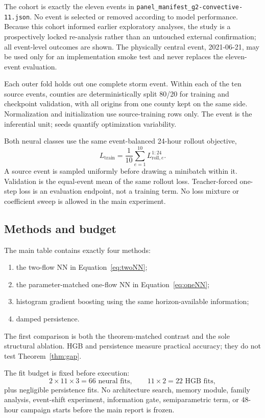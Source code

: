 \documentclass[twoside]{article}
\theoremstyle{plain}
\theoremstyle{definition}
\theoremstyle{remark}
\begin{document}
The cohort is exactly the eleven events in
\texttt{panel\_manifest\_g2-convective-11.json}. No event is selected or
removed according to model performance. Because this cohort informed earlier
exploratory analyses, the study is a prospectively locked re-analysis rather
than an untouched external confirmation; all event-level outcomes are shown.
The physically central event, 2021-06-21, may be used only for an implementation
smoke test and never replaces the eleven-event evaluation.

Each outer fold holds out one complete storm event. Within each of the ten
source events, counties are deterministically split 80/20 for training and
checkpoint validation, with all origins from one county kept on the same side.
Normalization and initialization use source-training rows only. The event is
the inferential unit; seeds quantify optimization variability.

Both neural classes use the same event-balanced 24-hour rollout objective,
\begin{equation}
L_{\mathrm{train}}=\frac1{10}\sum_{e=1}^{10}
L_{\mathrm{roll},e}^{1:24}.
\label{eq:objective}
\end{equation}
A source event is sampled uniformly before drawing a minibatch within it.
Validation is the equal-event mean of the same rollout loss. Teacher-forced
one-step loss is an evaluation endpoint, not a training term. No loss mixture
or coefficient sweep is allowed in the main experiment.

\subsection{Methods and budget}

The main table contains exactly four methods:
\begin{enumerate}
\item the two-flow NN in Equation~\eqref{eq:twoNN};
\item the parameter-matched one-flow NN in Equation~\eqref{eq:oneNN};
\item histogram gradient boosting using the same horizon-available information;
\item damped persistence.
\end{enumerate}
The first comparison is both the theorem-matched contrast and the sole
structural ablation. HGB and persistence measure practical accuracy; they do
not test Theorem~\ref{thm:gap}.

The fit budget is fixed before execution:
\[
2\times11\times3=66\text{ neural fits},\qquad
11\times2=22\text{ HGB fits},
\]
plus negligible persistence fits. No architecture search, memory module,
family analysis, event-shift experiment, information gate, semiparametric term,
or 48-hour campaign starts before the main report is frozen.
\end{document}
